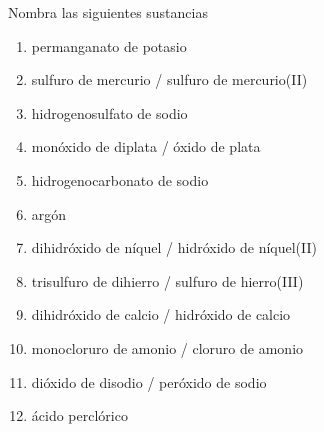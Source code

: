 \begin{exercise}[
    tags    = {inorgánica,nomenclatura,múltiple,2B},
    topics  = {química inorgánica,formulación,nomenclatura},
    source  = {Química 2B SAN 2016, p372, e7},
  ]
  Nombra las siguientes sustancias

  \begin{enumerate}\begin{multicols}{2}
    \item {}
    \item {}
    \item {}
    \item {}
    \item {}
    \item {}
    \item {}
    \item {}
    \item {}
    \item {}
    \item {}
    \item {}
  \end{multicols}\end{enumerate}
\end{exercise}

\begin{solution}
  \begin{enumerate}
    \item permanganato de potasio
    \item sulfuro de mercurio / sulfuro de mercurio(II)
    \item hidrogenosulfato de sodio
    \item monóxido de diplata / óxido de plata
    \item hidrogenocarbonato de sodio
    \item argón
    \item dihidróxido de níquel / hidróxido de níquel(II)
    \item trisulfuro de dihierro / sulfuro de hierro(III)
    \item dihidróxido de calcio / hidróxido de calcio
    \item monocloruro de amonio / cloruro de amonio
    \item dióxido de disodio / peróxido de sodio
    \item ácido perclórico
  \end{enumerate}
\end{solution}





